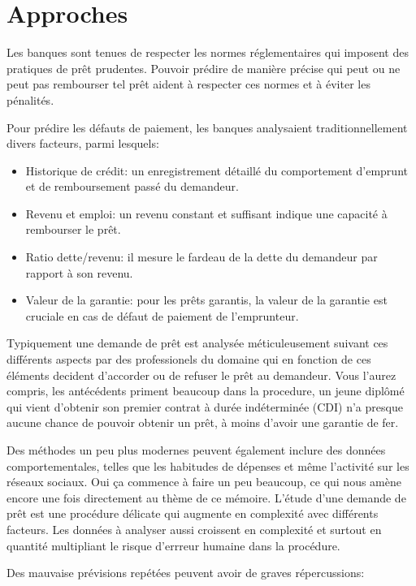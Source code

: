 \section{Approches}
\label{chap1.section2}
Les banques sont tenues de respecter les normes réglementaires qui imposent des pratiques de prêt prudentes. Pouvoir prédire de manière précise qui peut ou ne peut pas rembourser tel prêt aident à respecter ces normes et à éviter les pénalités.

Pour prédire les défauts de paiement, les banques analysaient traditionnellement  divers facteurs, parmi lesquels:

\begin{itemize}
    \item Historique de crédit: un enregistrement détaillé du comportement d’emprunt et de remboursement passé du demandeur.
    \item Revenu et emploi: un revenu constant et suffisant indique une capacité à rembourser le prêt.
    \item Ratio dette/revenu: il mesure le fardeau de la dette du demandeur par rapport à son revenu.
    \item Valeur de la garantie: pour les prêts garantis, la valeur de la garantie est cruciale en cas de défaut de paiement de l'emprunteur.
\end{itemize}

Typiquement une demande de prêt est analysée méticuleusement suivant ces différents aspects par des professionels du domaine qui en fonction de ces éléments decident d'accorder ou de refuser le prêt au demandeur. Vous l'aurez compris, les antécédents priment beaucoup dans la procedure, un jeune diplômé qui vient d'obtenir son premier contrat à durée indéterminée (CDI) n'a presque aucune chance de pouvoir obtenir un prêt, à moins d'avoir une garantie de fer.

Des méthodes un peu plus modernes peuvent également inclure des données comportementales, telles que les habitudes de dépenses et même l'activité sur les réseaux sociaux. Oui ça commence à faire un peu beaucoup, ce qui nous amène encore une fois directement au thème de ce mémoire. L'étude d'une demande de prêt est une procédure délicate qui augmente en complexité avec différents facteurs. Les données à analyser aussi croissent en complexité et surtout en quantité multipliant le risque d'errreur humaine dans la procédure.

Des mauvaise prévisions repétées peuvent avoir de graves répercussions:

